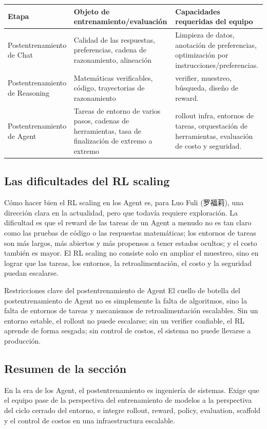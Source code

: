 \noindent\begin{tabularx}{\textwidth}{p{}p{}X}
\toprule
Etapa & Objeto de entrenamiento/evaluación & Capacidades requeridas del equipo \\
\midrule
Postentrenamiento de Chat & Calidad de las respuestas, preferencias, cadena de razonamiento, alineación & Limpieza de datos, anotación de preferencias, optimización por instrucciones/preferencias. \\
Postentrenamiento de Reasoning & Matemáticas verificables, código, trayectorias de razonamiento & verifier, muestreo, búsqueda, diseño de reward. \\
Postentrenamiento de Agent & Tareas de entorno de varios pasos, cadenas de herramientas, tasa de finalización de extremo a extremo & rollout infra, entornos de tareas, orquestación de herramientas, evaluación de costo y seguridad. \\
\bottomrule
\end{tabularx}

\subsection{Las dificultades del RL scaling}

Cómo hacer bien el RL scaling en los Agent es, para Luo Fuli (罗福莉), una dirección clara en la actualidad, pero que todavía requiere exploración. La dificultad es que el reward de las tareas de un Agent a menudo no es tan claro como las pruebas de código o las respuestas matemáticas; los entornos de tareas son más largos, más abiertos y más propensos a tener estados ocultos; y el costo también es mayor. El RL scaling no consiste solo en ampliar el muestreo, sino en lograr que las tareas, los entornos, la retroalimentación, el costo y la seguridad puedan escalarse.

\begin{importantbox}{Restricciones clave del postentrenamiento de Agent}
El cuello de botella del postentrenamiento de Agent no es simplemente la falta de algoritmos, sino la falta de entornos de tareas y mecanismos de retroalimentación escalables. Sin un entorno estable, el rollout no puede escalarse; sin un verifier confiable, el RL aprende de forma sesgada; sin control de costos, el sistema no puede llevarse a producción.
\end{importantbox}

\subsection{Resumen de la sección}

En la era de los Agent, el postentrenamiento es ingeniería de sistemas. Exige que el equipo pase de la perspectiva del entrenamiento de modelos a la perspectiva del ciclo cerrado del entorno, e integre rollout, reward, policy, evaluation, scaffold y el control de costos en una infraestructura escalable.
